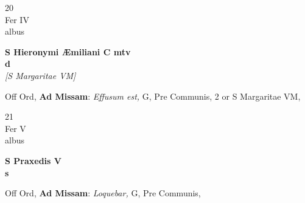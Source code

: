 \documentclass[10pt, openany]{book}
\begin{document}
        \begin{center}
            \begin{minipage}{3.5in}
                \vspace{2em}
                \begin{minipage}{0.5in}
                    {\Huge 20} \\
                    {\normalsize Fer IV} \\
                    {\normalsize albus}
                \end{minipage}
                \begin{minipage}{3.0in}
                    \textbf{ \large S Hieronymi Æmiliani C mtv \\
                    \textnormal{\normalsize d}} \\ \textit{[S Margaritae VM]} \\ 
                \end{minipage}
                \begin{justify}Off Ord, \textbf{Ad Missam}: \textit{Effusum est,} G, Pre Communis, 2 or S Margaritae VM,   
                \end{justify}
            \end{minipage}
        \end{center}
    
        \begin{center}
            \begin{minipage}{3.5in}
                \vspace{2em}
                \begin{minipage}{0.5in}
                    {\Huge 21} \\
                    {\normalsize Fer V} \\
                    {\normalsize albus}
                \end{minipage}
                \begin{minipage}{3.0in}
                    \textbf{ \large S Praxedis V \\
                    \textnormal{\normalsize s}} \\ 
                \end{minipage}
                \begin{justify}Off Ord, \textbf{Ad Missam}: \textit{Loquebar,} G, Pre Communis,   
                \end{justify}
            \end{minipage}
        \end{center}
    
\end{document}
